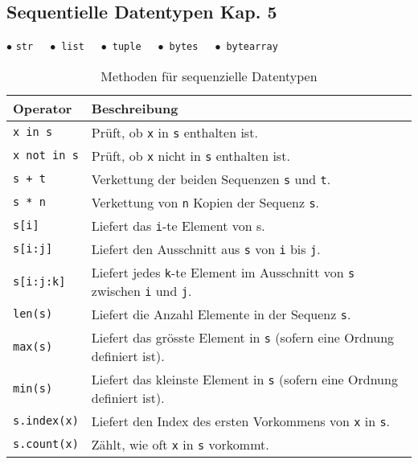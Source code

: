 \pagebreak
\subsection[Sequentielle Datentypen]{Sequentielle Datentypen \tiny{Kap. 5}}

$\bullet$ \texttt{str} $\quad \bullet$ \texttt{list} $\quad \bullet$ \texttt{tuple} $\quad \bullet$ \texttt{bytes} $\quad \bullet$ \texttt{bytearray}
\begin{table}[H]
\begin{threeparttable}
\caption{Methoden für sequenzielle Datentypen}
\begin{tabular}{|l|l|}
	\hline 
	\textbf{Operator} &\textbf{Beschreibung}\\ 
	\hline 
	\texttt{x in s} &Prüft, ob \texttt{x} in \texttt{s} enthalten ist.\\ 
	\texttt{x not in s} &Prüft, ob \texttt{x} nicht in \texttt{s} enthalten ist.\\
	\texttt{s + t} &Verkettung der beiden Sequenzen \texttt{s} und \texttt{t}.\\ 
	\texttt{s * n} &Verkettung von \texttt{n} Kopien der Sequenz \texttt{s}.\\ 
	\texttt{s[i]} &Liefert das \texttt{i}-te Element von s.\\ 
	\texttt{s[i:j]} &Liefert den Ausschnitt aus \texttt{s} von \texttt{i} bis \texttt{j}.\\
	\texttt{s[i:j:k]} &Liefert jedes \texttt{k}-te Element im Ausschnitt von \texttt{s} zwischen \texttt{i} und \texttt{j}.\\
	\texttt{len(s)} &Liefert die Anzahl Elemente in der Sequenz \texttt{s}.\\
	\texttt{max(s)} &Liefert das grösste Element in \texttt{s} (sofern eine Ordnung definiert ist).\\
	\texttt{min(s)} &Liefert das kleinste Element in \texttt{s} (sofern eine Ordnung definiert ist).\\
	\texttt{s.index(x)} &Liefert den Index des ersten Vorkommens von \texttt{x} in \texttt{s}.\\
	\texttt{s.count(x)} &Zählt, wie oft \texttt{x} in \texttt{s} vorkommt.\\
	\hline 
\end{tabular}
\end{threeparttable}
\end{table}

